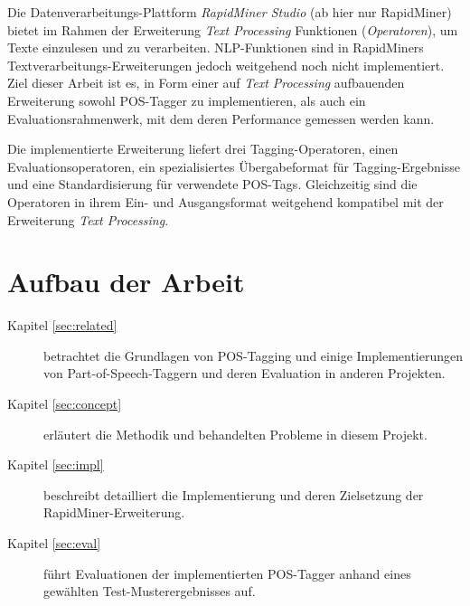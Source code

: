 Die Datenverarbeitungs-Plattform \textit{RapidMiner Studio} (ab hier nur RapidMiner) \cite{rapidminer} bietet im Rahmen der Erweiterung \textit{Text Processing} \cite{textprocessing} Funktionen (\textit{Operatoren}), um Texte einzulesen und zu verarbeiten. NLP-Funktionen sind in RapidMiners Textverarbeitungs-Erweiterungen jedoch weitgehend noch nicht implementiert. Ziel dieser Arbeit ist es, in Form einer auf \textit{Text Processing} aufbauenden Erweiterung sowohl POS-Tagger zu implementieren, als auch ein Evaluationsrahmenwerk, mit dem deren Performance gemessen werden kann.

Die implementierte Erweiterung liefert drei Tagging-Operatoren, einen Evaluationsoperatoren, ein spezialisiertes Übergabeformat für Tagging-Ergebnisse und eine Standardisierung für verwendete POS-Tags. Gleichzeitig sind die Operatoren in ihrem Ein- und Ausgangsformat weitgehend kompatibel mit der Erweiterung \textit{Text Processing}.



\section{Aufbau der Arbeit}
\label{sec:intro:structure}

\begin{description}

\item[Kapitel \ref{sec:related}] betrachtet die Grundlagen von POS-Tagging und einige Implementierungen von Part-of-Speech-Taggern und deren Evaluation in anderen Projekten.
\item[Kapitel \ref{sec:concept}] erläutert die Methodik und behandelten Probleme in diesem Projekt.
\item[Kapitel \ref{sec:impl}] beschreibt detailliert die Implementierung und deren Zielsetzung der RapidMiner-Erweiterung.
\item[Kapitel \ref{sec:eval}] führt Evaluationen der implementierten POS-Tagger anhand eines gewählten Test-Musterergebnisses auf.

\end{description}

